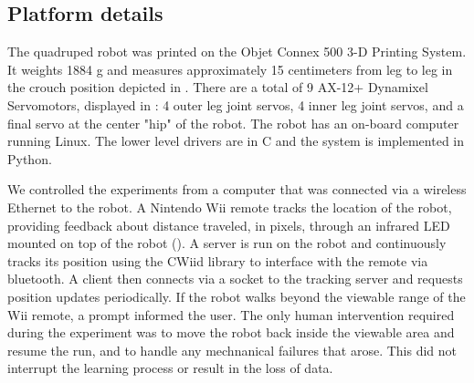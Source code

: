 \subsection{Platform details}













The quadruped robot was printed on the Objet
Connex 500 3-D Printing System. It weights 1884 g and measures approximately
15 centimeters from leg to leg in the crouch position depicted in
. There are a total of 9 AX-12+ Dynamixel
Servomotors, displayed in : 4 outer leg joint
servos, 4 inner leg joint servos, and a final servo at the center "hip" of the
robot. The robot has an on-board computer running Linux. 
The lower level drivers are in C and the system is implemented in Python. 


We controlled the experiments from a computer that was connected via a
wireless Ethernet to the robot. A Nintendo Wii remote tracks the location 
of the robot, providing feedback
about distance traveled, in pixels, through an infrared LED mounted on top of 
the robot (). A server is run on the robot and continuously tracks its
position using the CWiid library\cite{cwiid} to interface with the remote
via bluetooth. A client then connects via a socket to the tracking
server and requests position updates periodically. If the robot walks 
beyond the viewable range of the Wii remote, a prompt informed the
user. The only human intervention required during the
experiment was to move the robot back inside the viewable area and resume
the run, and to handle any mechnanical failures that arose. This did not
interrupt the learning process or result in the loss of data.

